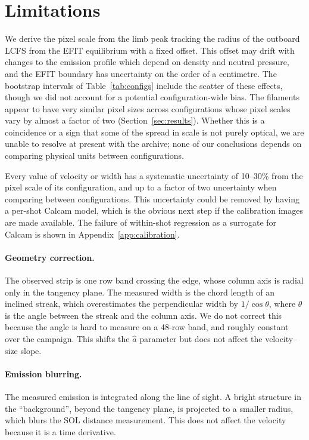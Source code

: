 \section{Limitations}
\label{sec:discussion}

We derive the pixel scale from the limb peak tracking the radius of the outboard LCFS from the EFIT equilibrium with a fixed offset. This offset may drift with changes to the emission profile which depend on density and neutral pressure, and the EFIT boundary has uncertainty on the order of a centimetre. The bootstrap intervals of Table~\ref{tab:configs} include the scatter of these effects, though we did not account for a potential configuration-wide bias. The filaments appear to have very similar pixel sizes across configurations whose pixel scales vary by almost a factor of two (Section~\ref{sec:results}). Whether this is a coincidence or a sign that some of the spread in scale is not purely optical, we are unable to resolve at present with the archive; none of our conclusions depends on comparing physical units between configurations.

Every value of velocity or width has a systematic uncertainty of 10--30\% from the pixel scale of its configuration, and up to a factor of two uncertainty when comparing between configurations. This uncertainty could be removed by having a per-shot Calcam model, which is the obvious next step if the calibration images are made available. The failure of within-shot regression as a surrogate for Calcam is shown in Appendix~\ref{app:calibration}.

\paragraph{Geometry correction.}
The observed strip is one row band crossing the edge, whose column axis is radial only in the tangency plane. The measured width is the chord length of an inclined streak, which overestimates the perpendicular width by $1/\cos\theta$, where $\theta$ is the angle between the streak and the column axis. We do not correct this because the angle is hard to measure on a 48-row band, and roughly constant over the campaign. This shifts the $\hat a$ parameter but does not affect the velocity--size slope.

\paragraph{Emission blurring.}
The measured emission is integrated along the line of sight. A bright structure in the ``background'', beyond the tangency plane, is projected to a smaller radius, which blurs the SOL distance measurement. This does not affect the velocity because it is a time derivative.

